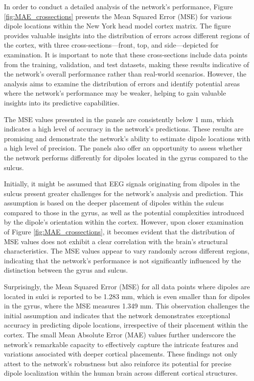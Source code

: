 \documentclass[a4paper, UKenglish, 11pt]{uiomaster}
\begin{document}
In order to conduct a detailed analysis of the network's performance, Figure \ref{fig:MAE_crossections} presents the Mean Squared Error (MSE) for various dipole locations within the New York head model cortex matrix. The figure provides valuable insights into the distribution of errors across different regions of the cortex, with three cross-sections—front, top, and side—depicted for examination. It is important to note that these cross-sections include data points from the training, validation, and test datasets, making these results indicative of the network's overall performance rather than real-world scenarios. However, the analysis aims to examine the distribution of errors and identify potential areas where the network's performance may be weaker, helping to gain valuable insights into its predictive capabilities.

The MSE values presented in the panels are consistently below 1 mm, which indicates a high level of accuracy in the network's predictions. These results are promising and demonstrate the network's ability to estimate dipole locations with a high level of precision. The panels also offer an opportunity to assess whether the network performs differently for dipoles located in the gyrus compared to the sulcus.

Initially, it might be assumed that EEG signals originating from dipoles in the sulcus present greater challenges for the network's analysis and prediction. This assumption is based on the deeper placement of dipoles within the sulcus compared to those in the gyrus, as well as the potential complexities introduced by the dipole's orientation within the cortex. However, upon closer examination of Figure \ref{fig:MAE_crossections}, it becomes evident that the distribution of MSE values does not exhibit a clear correlation with the brain's structural characteristics. The MSE values appear to vary randomly across different regions, indicating that the network's performance is not significantly influenced by the distinction between the gyrus and sulcus.

Surprisingly, the Mean Squared Error (MSE) for all data points where dipoles are located in sulci is reported to be 1.283 mm, which is even smaller than for dipoles in the gyrus, where the MSE measures 1.349 mm. This observation challenges the initial assumption and indicates that the network demonstrates exceptional accuracy in predicting dipole locations, irrespective of their placement within the cortex. The small Mean Absolute Error (MAE) values further underscore the network's remarkable capacity to effectively capture the intricate features and variations associated with deeper cortical placements. These findings not only attest to the network's robustness but also reinforce its potential for precise dipole localization within the human brain across different cortical structures.
\end{document}
